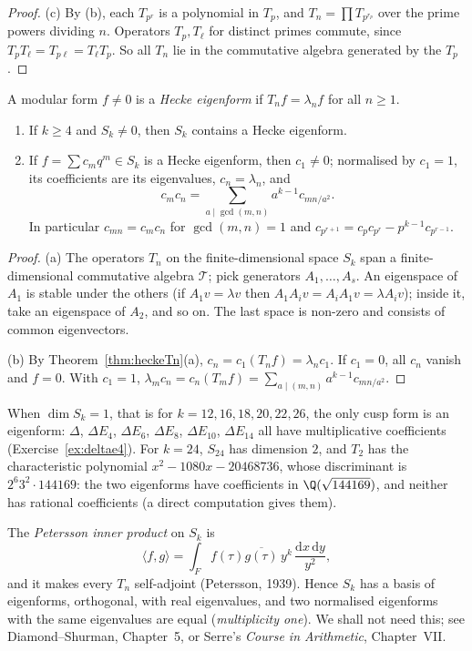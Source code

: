 \begin{proof}
(c) By (b), each $T_{p^r}$ is a polynomial in $T_p$, and $T_n=\prod T_{p^{r_p}}$ over the prime powers dividing $n$. Operators $T_p,T_\ell$ for distinct primes commute,
since $T_pT_\ell=T_{p\ell}=T_\ell T_p$. So all $T_n$ lie in the commutative algebra generated by the $T_p$.
\end{proof}

A modular form $f\ne0$ is a \emph{Hecke eigenform} if $T_nf=\lambda_nf$ for all $n\ge1$.

\begin{corollary}\label{cor:eigen}
\begin{enumerate}[label=(\alph*)]
\item If $k\ge4$ and $S_k\ne0$, then $S_k$ contains a Hecke eigenform.
\item If $f=\sum c_mq^m\in S_k$ is a Hecke eigenform, then $c_1\ne0$; normalised by $c_1=1$, its coefficients are its eigenvalues, $c_n=\lambda_n$, and
\[
c_mc_n=\sum_{a\mid\gcd(m,n)}a^{k-1}c_{mn/a^2}.
\]
In particular $c_{mn}=c_mc_n$ for $\gcd(m,n)=1$ and $c_{p^{r+1}}=c_pc_{p^r}-p^{k-1}c_{p^{r-1}}$.
\end{enumerate}
\end{corollary}
\begin{proof}
(a) The operators $T_n$ on the finite-dimensional space $S_k$ span a finite-dimensional commutative algebra $\mathcal T$; pick generators $A_1,\dots,A_s$. An eigenspace
of $A_1$ is stable under the others (if $A_1v=\lambda v$ then $A_1A_iv=A_iA_1v=\lambda A_iv$); inside it, take an eigenspace of $A_2$, and so on. The last space is
non-zero and consists of common eigenvectors.

(b) By Theorem~\ref{thm:heckeTn}(a), $c_n=c_1(T_nf)=\lambda_nc_1$. If $c_1=0$, all $c_n$ vanish and $f=0$. With $c_1=1$, $\lambda_mc_n=c_n(T_mf)=\sum_{a\mid(m,n)}a^{k-1}c_{mn/a^2}$.
\end{proof}

When $\dim S_k=1$, that is for $k=12,16,18,20,22,26$, the only cusp form is an eigenform: $\Delta$, $\Delta E_4$, $\Delta E_6$, $\Delta E_8$, $\Delta E_{10}$, $\Delta E_{14}$ all have
multiplicative coefficients (Exercise~\ref{ex:deltae4}). For $k=24$, $S_{24}$ has dimension $2$, and $T_2$ has the characteristic polynomial $x^2-1080x-20468736$, whose
discriminant is $2^{6}3^2\cdot144169$: the two eigenforms have coefficients in $\Q(\sqrt{144169})$, and neither has rational coefficients (a direct computation gives them).

\begin{remark}[Petersson]
The \emph{Petersson inner product} on $S_k$ is
\[
\langle f,g\rangle=\int_Ff(\tau)\overline{g(\tau)}\,y^k\,\frac{\mathrm dx\,\mathrm dy}{y^2},
\]
and it makes every $T_n$ self-adjoint (Petersson, 1939). Hence $S_k$ has a basis of eigenforms, orthogonal, with real eigenvalues, and two normalised eigenforms with the same eigenvalues are equal (\emph{multiplicity one}).
We shall not need this; see Diamond--Shurman, Chapter~5, or Serre's \emph{Course in Arithmetic}, Chapter~VII.
\end{remark}

